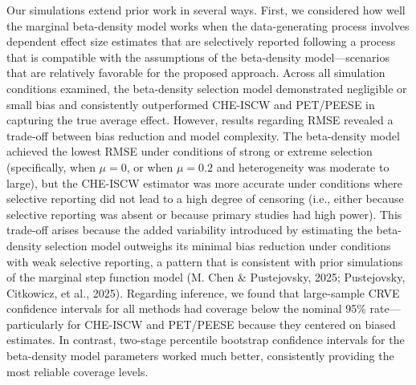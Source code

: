 \documentclass[
  american,
  man, donotrepeattitle,floatsintext]{apa7}
\begin{document}
Our simulations extend prior work in several ways. First, we considered how well the marginal beta-density model works when the data-generating process involves dependent effect size estimates that are selectively reported following a process that is compatible with the assumptions of the beta-density model---scenarios that are relatively favorable for the proposed approach.
Across all simulation conditions examined, the beta-density selection model demonstrated negligible or small bias and consistently outperformed CHE-ISCW and PET/PEESE in capturing the true average effect.
However, results regarding RMSE revealed a trade-off between bias reduction and model complexity.
The beta-density model achieved the lowest RMSE under conditions of strong or extreme selection (specifically, when \(\mu = 0\), or when \(\mu = 0.2\) and heterogeneity was moderate to large), but the CHE-ISCW estimator was more accurate under conditions where selective reporting did not lead to a high degree of censoring (i.e., either because selective reporting was absent or because primary studies had high power).
This trade-off arises because the added variability introduced by estimating the beta-density selection model outweighs its minimal bias reduction under conditions with weak selective reporting, a pattern that is consistent with prior simulations of the marginal step function model (M. Chen \& Pustejovsky, 2025; Pustejovsky, Citkowicz, et al., 2025).
Regarding inference, we found that large-sample CRVE confidence intervals for all methods had coverage below the nominal 95\% rate---particularly for CHE-ISCW and PET/PEESE because they centered on biased estimates.
In contrast, two-stage percentile bootstrap confidence intervals for the beta-density model parameters worked much better, consistently providing the most reliable coverage levels.
\end{document}
